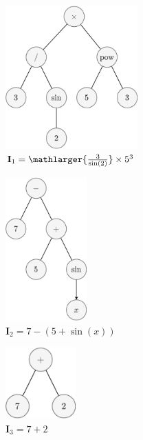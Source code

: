   \begin{figure}[ht!]
    \centering
    \begin{subfigure}[t]{0.4\textwidth}
      \centering
      \includegraphics[height=5.5cm]{img/theoretical_framework/GP Initial Population 1.png}
      \caption{\(\mathbf{I}_1 = \mathlarger{\frac{3}{\sin(2)}} \times 5^3\)}
      \label{fig:bg:gp:init:population:1}
    \end{subfigure}
    \begin{subfigure}[t]{0.4\textwidth}
      \centering
      \includegraphics[height=5.5cm]{img/theoretical_framework/GP Initial Population 2.png}
      \caption{\(\mathbf{I}_2 = 7 - (5 + \sin(x))\)}
      \label{fig:bg:gp:init:population:2}
    \end{subfigure}
    \begin{subfigure}[t]{0.4\textwidth}
      \centering
      \includegraphics[height=2.75cm]{img/theoretical_framework/GP Initial Population 3.png}
      \caption{\(\mathbf{I}_3 = 7 + 2\)}
      \label{fig:bg:gp:init:population:3}
    \end{subfigure}
    \begin{subfigure}[t]{0.4\textwidth}

\end{subfigure}
\end{figure}
